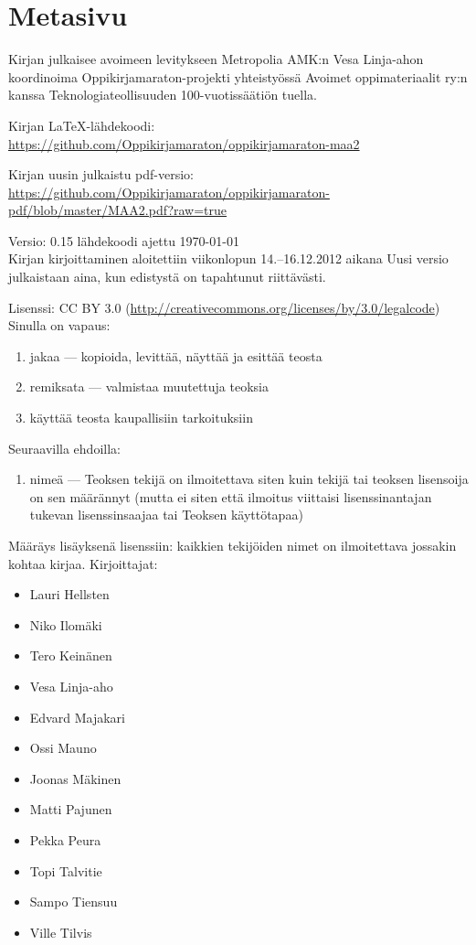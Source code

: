 \newpage
\section*{Metasivu}


Kirjan julkaisee avoimeen levitykseen Metropolia AMK:n Vesa Linja-ahon koordinoima Oppikirjamaraton-projekti yhteistyössä Avoimet oppimateriaalit ry:n kanssa Teknologiateollisuuden 100-vuotissäätiön tuella.

Kirjan LaTeX-lähdekoodi: \\
\url{https://github.com/Oppikirjamaraton/oppikirjamaraton-maa2}

Kirjan uusin julkaistu pdf-versio: \\
\url{https://github.com/Oppikirjamaraton/oppikirjamaraton-pdf/blob/master/MAA2.pdf?raw=true}

Versio: 0.15 \qquad lähdekoodi ajettu \today \\
Kirjan kirjoittaminen aloitettiin viikonlopun 14.--16.12.2012 aikana
Uusi versio julkaistaan aina, kun edistystä on tapahtunut riittävästi.

Lisenssi: CC BY 3.0 (\url{http://creativecommons.org/licenses/by/3.0/legalcode})\\
Sinulla on vapaus:
\begin{enumerate}
\item jakaa — kopioida, levittää, näyttää ja esittää teosta
\item remiksata — valmistaa muutettuja teoksia
\item käyttää teosta kaupallisiin tarkoituksiin
\end{enumerate}
Seuraavilla ehdoilla:
\begin{enumerate}
\item nimeä — Teoksen tekijä on ilmoitettava siten kuin tekijä tai teoksen lisensoija on sen määrännyt (mutta ei siten että ilmoitus viittaisi lisenssinantajan tukevan lisenssinsaajaa tai Teoksen käyttötapaa)
\end{enumerate}

Määräys lisäyksenä lisenssiin: kaikkien tekijöiden nimet on ilmoitettava jossakin kohtaa kirjaa.
Kirjoittajat:
\begin{itemize}
\item Lauri Hellsten
\item Niko Ilomäki
\item Tero Keinänen
\item Vesa Linja-aho
\item Edvard Majakari
\item Ossi Mauno
\item Joonas Mäkinen
\item Matti Pajunen
\item Pekka Peura
\item Topi Talvitie
\item Sampo Tiensuu
\item Ville Tilvis
\end{itemize}

